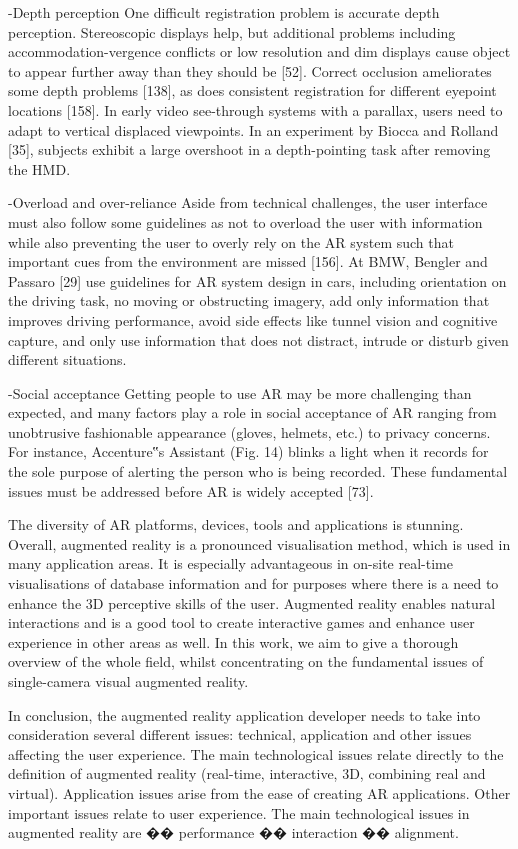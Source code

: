 -Depth perception
One difficult registration problem is accurate depth perception.
Stereoscopic displays help, but additional problems
including accommodation-vergence conflicts or low resolution
and dim displays cause object to appear further away
than they should be [52]. Correct occlusion ameliorates some
depth problems [138], as does consistent registration for
different eyepoint locations [158].
In early video see-through systems with a parallax, users
need to adapt to vertical displaced viewpoints. In an experiment
by Biocca and Rolland [35], subjects exhibit a large
overshoot in a depth-pointing task after removing the HMD.

-Overload and over-reliance
Aside from technical challenges, the user interface must
also follow some guidelines as not to overload the user with
information while also preventing the user to overly rely on
the AR system such that important cues from the environment
are missed [156]. At BMW, Bengler and Passaro [29] use
guidelines for AR system design in cars, including orientation
on the driving task, no moving or obstructing imagery,
add only information that improves driving performance,
avoid side effects like tunnel vision and cognitive capture,
and only use information that does not distract, intrude or
disturb given different situations.

-Social acceptance
Getting people to use AR may be more challenging than
expected, and many factors play a role in social acceptance of
AR ranging from unobtrusive fashionable appearance
(gloves, helmets, etc.) to privacy concerns. For instance,
Accenture‟s Assistant (Fig. 14) blinks a light when it records
for the sole purpose of alerting the person who is being recorded.
These fundamental issues must be addressed before
AR is widely accepted [73].

The diversity of AR platforms, devices, tools and applications is stunning. Overall,
augmented reality is a pronounced visualisation method, which is used in many
application areas. It is especially advantageous in on-site real-time visualisations
of database information and for purposes where there is a need to enhance the
3D perceptive skills of the user. Augmented reality enables natural interactions
and is a good tool to create interactive games and enhance user experience in
other areas as well. In this work, we aim to give a thorough overview of the whole
field, whilst concentrating on the fundamental issues of single-camera visual augmented
reality.


In conclusion, the augmented reality application developer needs to take into consideration several different issues: technical, application and other issues affecting the user experience. The main technological issues relate directly to the definition of augmented reality (real-time, interactive, 3D, combining real and virtual). Application issues arise from the ease of creating AR applications. Other important issues relate to user experience. The main technological issues in augmented reality are �� performance �� interaction �� alignment.

